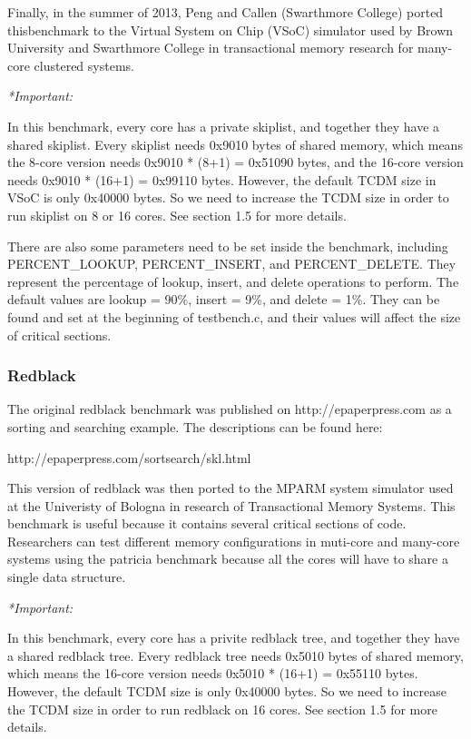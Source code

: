 \documentclass{article}
\begin{document}
Finally, in the summer of 2013, Peng and Callen (Swarthmore College) ported 
thisbenchmark to the Virtual System on Chip (VSoC) simulator used by Brown 
University and Swarthmore College in transactional memory research for 
many-core clustered systems. 

\vspace{2mm}
\emph{*Important:} 

In this benchmark, every core has a private skiplist, and together they have a
shared skiplist. Every skiplist needs 0x9010 bytes of shared memory, which 
means the 8-core version needs 0x9010 * (8+1) = 0x51090 bytes,
and the 16-core version needs 0x9010 * (16+1) = 0x99110 bytes. However, the 
default TCDM size in VSoC is only 0x40000 bytes. So we need to 
increase the TCDM size in order to run skiplist on 8 or 16 cores.
 See section 1.5 for more details.

There are also some parameters need to be set inside the benchmark, including 
 PERCENT\_LOOKUP, PERCENT\_INSERT, and PERCENT\_DELETE. They 
represent the percentage of lookup, insert, and delete operations to perform.
The default values are lookup = 90\%, insert = 9\%, and 
delete = 1\%. They can be found and set at the beginning of testbench.c,
and their values will affect the size of critical sections. 

\subsubsection{Redblack}


The original redblack benchmark was published on http://epaperpress.com
as a sorting and searching example. The descriptions can be found here:

http://epaperpress.com/sortsearch/skl.html

This version of redblack was then ported to the MPARM system simulator used at 
the Univeristy of Bologna in research of Transactional Memory Systems. This
benchmark is useful because it contains several critical sections of code. 
Researchers can test different memory configurations in muti-core and many-core 
systems using the patricia benchmark because all the cores will have to share a 
single data structure. 

\vspace{2mm}
\emph{*Important:} 

In this benchmark, every core has a privite redblack tree, and together they 
have a shared redblack tree. Every redblack tree needs 0x5010 bytes of shared 
memory, which means the 16-core version needs 0x5010 * (16+1) = 0x55110 bytes. 
However, the default TCDM size is only 0x40000 bytes. 
So we need to increase the TCDM size in order to run redblack on 16 cores. 
See section 1.5 for more details.
\end{document}
